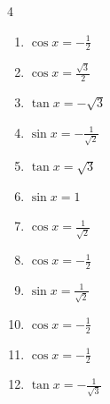 \begin{multicols}{4}
\begin{enumerate}
  \item $\displaystyle \cos{x}  = -\frac{1}{2}$


  \item $\displaystyle \cos{x}  = \frac{\sqrt{3}}{2}$


  \item $\displaystyle \tan{x}  = -\sqrt{3}$


  \item $\displaystyle \sin{x}  = -\frac{1}{\sqrt{2}}$


  \item $\displaystyle \tan{x}  = \sqrt{3}$


  \item $\displaystyle \sin{x}  = 1$


  \item $\displaystyle \cos{x}  = \frac{1}{\sqrt{2}}$


  \item $\displaystyle \cos{x}  = -\frac{1}{2}$


  \item $\displaystyle \sin{x}  = \frac{1}{\sqrt{2}}$


  \item $\displaystyle \cos{x}  = -\frac{1}{2}$


  \item $\displaystyle \cos{x}  = -\frac{1}{2}$


  \item $\displaystyle \tan{x}  = -\frac{1}{\sqrt{3}}$


\end{enumerate}
\end{multicols}
